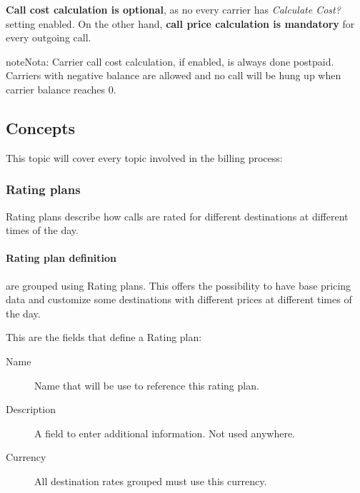 \documentclass[letterpaper,10pt,spanish]{sphinxmanual}
\begin{document}
\textbf{Call cost calculation is optional}, as no every carrier has \emph{Calculate Cost?} setting enabled. On the other hand, \textbf{call
price calculation is mandatory} for every outgoing call.

\begin{notice}{note}{Nota:}
Carrier call cost calculation, if enabled, is always done postpaid. Carriers with negative balance are allowed and
no call will be hung up when carrier balance reaches 0.
\end{notice}


\subsection{Concepts}
\label{administration_portal/brand/billing/index:concepts}
This topic will cover every topic involved in the billing process:


\subsubsection{Rating plans}
\label{administration_portal/brand/billing/rating_plans:rating-plans}\label{administration_portal/brand/billing/rating_plans::doc}
Rating plans describe how calls are rated for different destinations at different times of the day.


\paragraph{Rating plan definition}
\label{administration_portal/brand/billing/rating_plans:rating-plan-definition}
{\hyperref[administration_portal/brand/billing/destination_rates:destination\string-rates]{}} are grouped using Rating plans. This offers the possibility to have base pricing data and customize
some destinations with different prices at different times of the day.

This are the fields that define a Rating plan:
\begin{description}
\item[{Name}] \leavevmode{}\label{administration_portal/brand/billing/rating_plans:term-name}
Name that will be use to reference this rating plan.

\item[{Description}] \leavevmode{}\label{administration_portal/brand/billing/rating_plans:term-description}
A field to enter additional information. Not used anywhere.

\item[{Currency}] \leavevmode{}\label{administration_portal/brand/billing/rating_plans:term-currency}
All destination rates grouped must use this currency.

\end{description}
\end{document}
